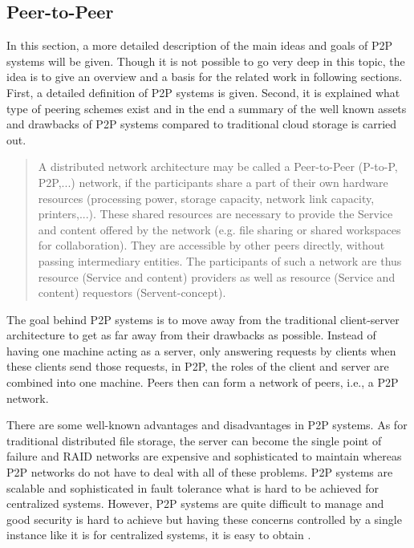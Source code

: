 \subsection{Peer-to-Peer}
In this section, a more detailed description of the main ideas and goals of P2P systems will be given. Though it is not possible to go very deep in this topic, the idea is to give an overview and a basis for the related work in following sections. First, a detailed definition of P2P systems is given. Second, it is explained what type of peering schemes exist and in the end a summary of the well known assets and drawbacks of P2P systems compared to traditional cloud storage is carried out.
\begin{quote}
A distributed network architecture may be called a Peer-to-Peer (P-to-P, P2P,...) network, if the participants share a part of their own hardware resources (processing power, storage capacity, network link capacity, printers,...). These shared resources are necessary to provide the Service and content offered by the network (e.g. file sharing or shared workspaces for collaboration). They are accessible by other peers directly, without passing intermediary entities. The participants of such a network are thus resource (Service and content) providers as well as resource (Service and content) requestors (Servent-concept). \cite{p2p:definition}
\end{quote}
The goal behind P2P systems is to move away from the traditional client-server architecture to get as far away from their drawbacks as possible. Instead of having one machine acting as a server, only answering requests by clients when these clients send those requests, in P2P, the roles of the client and server are combined into one machine. Peers then can form a network of peers, i.e., a P2P network.

There are some well-known advantages and disadvantages in P2P systems. As for traditional distributed file storage, the server can become the single point of failure and RAID networks are expensive and sophisticated to maintain whereas P2P networks do not have to deal with all of these problems. P2P systems are scalable and sophisticated in fault tolerance what is hard to be achieved for centralized systems. However, P2P systems are quite difficult to manage and good security is hard to achieve but having these concerns controlled by a single instance like it is for centralized systems, it is easy to obtain \cite{tomp2p:p2p_introduction}. %


